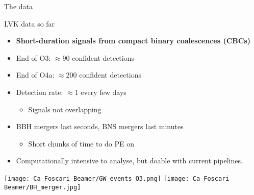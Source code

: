 \documentclass[aspectratio=169, 11pt]{beamer}
\def \bblock{\begin{beamerboxesrounded}[upper=uppercolor,lower=lowercolor,shadow=true]}
\def \eblock{\end{beamerboxesrounded}}
\begin{document}
\begin{frame}{The data}
 \begin{minipage}{0.55\textwidth} \vspace{0.5cm}
 \bblock{\centering LVK data so far}
\begin{itemize} 
\item \textbf{Short-duration signals from compact binary coalescences (CBCs)}
\item End of O3: $\approx 90$ confident detections  
\item End of O4a: $\approx 200$ confident detections 
\item Detection rate: $\approx 1$ every few days 
    \begin{itemize}
        \item Signals not overlapping
    \end{itemize}
\item BBH mergers last seconds, BNS mergers last minutes
    \begin{itemize}
        \item Short chunks of time to do PE on
    \end{itemize}
\item Computationally intensive to analyse, but doable with current pipelines.
\end{itemize} 
\eblock
\end{minipage}\hfill                                               \begin{minipage}{0.4\textwidth}\vspace{0.8cm}                          \centering                                          
    \texttt{[image: Ca\_Foscari Beamer/GW\_events\_O3.png]} \vfill
    \texttt{[image: Ca\_Foscari Beamer/BH\_merger.jpg]}
\end{minipage}                                                    
\end{frame}
\end{document}
